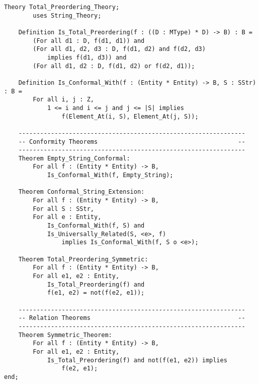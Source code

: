 \begin{lstlisting}[language=resolve]
Theory Total_Preordering_Theory;
		uses String_Theory;

	Definition Is_Total_Preordering(f : ((D : MType) * D) -> B) : B =
		(For all d1 : D, f(d1, d1)) and
		(For all d1, d2, d3 : D, f(d1, d2) and f(d2, d3) 
			implies f(d1, d3)) and
		(For all d1, d2 : D, f(d1, d2) or f(d2, d1));		

	Definition Is_Conformal_With(f : (Entity * Entity) -> B, S : SStr) : B =
		For all i, j : Z,
			1 <= i and i <= j and j <= |S| implies
				f(Element_At(i, S), Element_At(j, S));

	---------------------------------------------------------------
	-- Conformity Theorems                                       --
	---------------------------------------------------------------
	Theorem Empty_String_Conformal:
		For all f : (Entity * Entity) -> B,
			Is_Conformal_With(f, Empty_String);

	Theorem Conformal_String_Extension:
		For all f : (Entity * Entity) -> B,
		For all S : SStr,
		For all e : Entity,
			Is_Conformal_With(f, S) and
			Is_Universally_Related(S, <e>, f)
				implies Is_Conformal_With(f, S o <e>);

	Theorem Total_Preordering_Symmetric:
		For all f : (Entity * Entity) -> B,
		For all e1, e2 : Entity,
			Is_Total_Preordering(f) and
			f(e1, e2) = not(f(e2, e1));

	---------------------------------------------------------------
	-- Relation Theorems                                         --
	---------------------------------------------------------------
	Theorem Symmetric_Theorem:
		For all f : (Entity * Entity) -> B,
		For all e1, e2 : Entity,
			Is_Total_Preordering(f) and not(f(e1, e2)) implies
				f(e2, e1);
end;
\end{lstlisting}
